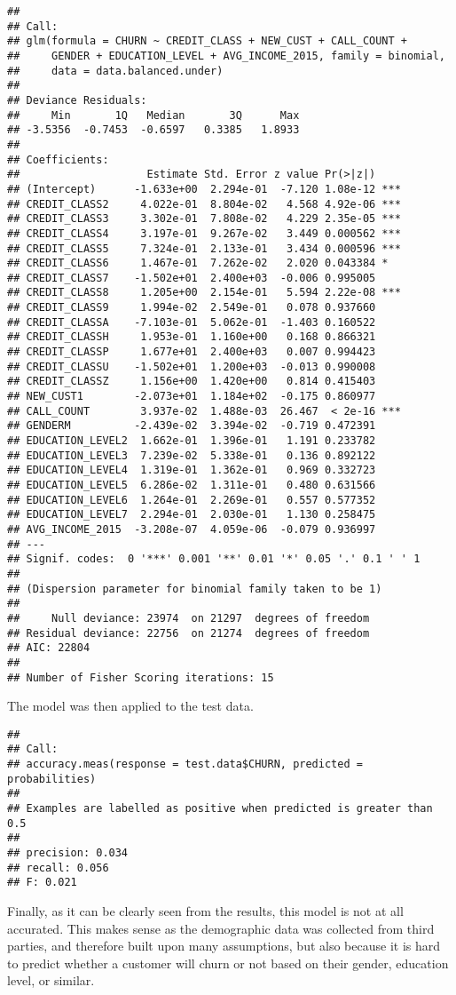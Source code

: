 \documentclass[]{article}
\begin{document}
\begin{verbatim}
## 
## Call:
## glm(formula = CHURN ~ CREDIT_CLASS + NEW_CUST + CALL_COUNT + 
##     GENDER + EDUCATION_LEVEL + AVG_INCOME_2015, family = binomial, 
##     data = data.balanced.under)
## 
## Deviance Residuals: 
##     Min       1Q   Median       3Q      Max  
## -3.5356  -0.7453  -0.6597   0.3385   1.8933  
## 
## Coefficients:
##                    Estimate Std. Error z value Pr(>|z|)    
## (Intercept)      -1.633e+00  2.294e-01  -7.120 1.08e-12 ***
## CREDIT_CLASS2     4.022e-01  8.804e-02   4.568 4.92e-06 ***
## CREDIT_CLASS3     3.302e-01  7.808e-02   4.229 2.35e-05 ***
## CREDIT_CLASS4     3.197e-01  9.267e-02   3.449 0.000562 ***
## CREDIT_CLASS5     7.324e-01  2.133e-01   3.434 0.000596 ***
## CREDIT_CLASS6     1.467e-01  7.262e-02   2.020 0.043384 *  
## CREDIT_CLASS7    -1.502e+01  2.400e+03  -0.006 0.995005    
## CREDIT_CLASS8     1.205e+00  2.154e-01   5.594 2.22e-08 ***
## CREDIT_CLASS9     1.994e-02  2.549e-01   0.078 0.937660    
## CREDIT_CLASSA    -7.103e-01  5.062e-01  -1.403 0.160522    
## CREDIT_CLASSH     1.953e-01  1.160e+00   0.168 0.866321    
## CREDIT_CLASSP     1.677e+01  2.400e+03   0.007 0.994423    
## CREDIT_CLASSU    -1.502e+01  1.200e+03  -0.013 0.990008    
## CREDIT_CLASSZ     1.156e+00  1.420e+00   0.814 0.415403    
## NEW_CUST1        -2.073e+01  1.184e+02  -0.175 0.860977    
## CALL_COUNT        3.937e-02  1.488e-03  26.467  < 2e-16 ***
## GENDERM          -2.439e-02  3.394e-02  -0.719 0.472391    
## EDUCATION_LEVEL2  1.662e-01  1.396e-01   1.191 0.233782    
## EDUCATION_LEVEL3  7.239e-02  5.338e-01   0.136 0.892122    
## EDUCATION_LEVEL4  1.319e-01  1.362e-01   0.969 0.332723    
## EDUCATION_LEVEL5  6.286e-02  1.311e-01   0.480 0.631566    
## EDUCATION_LEVEL6  1.264e-01  2.269e-01   0.557 0.577352    
## EDUCATION_LEVEL7  2.294e-01  2.030e-01   1.130 0.258475    
## AVG_INCOME_2015  -3.208e-07  4.059e-06  -0.079 0.936997    
## ---
## Signif. codes:  0 '***' 0.001 '**' 0.01 '*' 0.05 '.' 0.1 ' ' 1
## 
## (Dispersion parameter for binomial family taken to be 1)
## 
##     Null deviance: 23974  on 21297  degrees of freedom
## Residual deviance: 22756  on 21274  degrees of freedom
## AIC: 22804
## 
## Number of Fisher Scoring iterations: 15
\end{verbatim}

The model was then applied to the test data.

\begin{verbatim}
## 
## Call: 
## accuracy.meas(response = test.data$CHURN, predicted = probabilities)
## 
## Examples are labelled as positive when predicted is greater than 0.5 
## 
## precision: 0.034
## recall: 0.056
## F: 0.021
\end{verbatim}

Finally, as it can be clearly seen from the results, this model is not
at all accurated. This makes sense as the demographic data was collected
from third parties, and therefore built upon many assumptions, but also
because it is hard to predict whether a customer will churn or not based
on their gender, education level, or similar.
\end{document}
